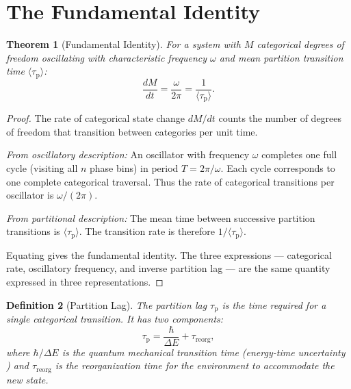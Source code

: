 \documentclass[11pt,twocolumn,a4paper]{article}
\newtheorem{theorem}{Theorem}[section]
\newtheorem{definition}[theorem]{Definition}
\newcommand{\taup}{\tau_{\mathrm{p}}}
\begin{document}
\section{The Fundamental Identity}
\label{sec:fundamental-identity}

\begin{theorem}[Fundamental Identity]
\label{thm:fundamental-identity}
For a system with $M$ categorical degrees of freedom oscillating with
characteristic frequency $\omega$ and mean partition transition time
$\langle \taup \rangle$:
\begin{equation}
\frac{dM}{dt} = \frac{\omega}{2\pi} = \frac{1}{\langle \taup \rangle}.
\label{eq:fundamental-identity}
\end{equation}
\end{theorem}

\begin{proof}
The rate of categorical state change $dM/dt$ counts the number of
degrees of freedom that transition between categories per unit time.

\textit{From oscillatory description:} An oscillator with frequency
$\omega$ completes one full cycle (visiting all $n$ phase bins) in
period $T = 2\pi/\omega$. Each cycle corresponds to one complete
categorical traversal. Thus the rate of categorical transitions per
oscillator is $\omega/(2\pi)$.

\textit{From partitional description:} The mean time between
successive partition transitions is $\langle \taup \rangle$. The
transition rate is therefore $1/\langle \taup \rangle$.

Equating gives the fundamental identity. The three expressions ---
categorical rate, oscillatory frequency, and inverse partition lag ---
are the same quantity expressed in three representations.
\end{proof}

\begin{definition}[Partition Lag]
\label{def:partition-lag}
The partition lag $\taup$ is the time required for a single categorical
transition. It has two components:
\begin{equation}
\taup = \frac{\hbar}{\Delta E} + \tau_{\mathrm{reorg}},
\label{eq:partition-lag}
\end{equation}
where $\hbar/\Delta E$ is the quantum mechanical transition time
(energy-time uncertainty \citep{heisenberg1927}) and
$\tau_{\mathrm{reorg}}$ is the reorganization time for the
environment to accommodate the new state.
\end{definition}
\end{document}
